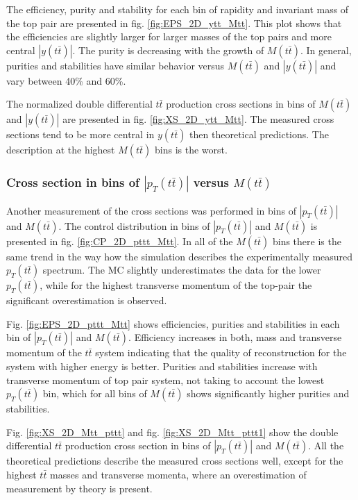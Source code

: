 The efficiency, purity and stability for each bin of rapidity and invariant mass of the top pair are presented in fig. \ref{fig:EPS_2D_ytt_Mtt}. This plot
shows that the efficiencies are slightly larger for larger masses of the top pairs and more central $|y(t\bar{t})|$. The purity is decreasing with the
growth of $M(t\bar{t})$. In general, purities and stabilities have similar behavior versus $M(t\bar{t})$ and $|y(t\bar{t})|$ and vary between 40\% and 60\%.

The normalized double differential $t\bar{t}$ production cross sections in bins of $M(t\bar{t})$ and $|y(t\bar{t})|$ are presented in fig. \ref{fig:XS_2D_ytt_Mtt}.
The measured cross sections tend to be more central in $y(t\bar{t})$ then theoretical predictions. The description at the highest $M(t\bar{t})$ bins is the worst.

\subsubsection{Cross section in bins of $|p_{T}(t\bar{t})|$ versus $M(t\bar{t})$}

Another measurement of the cross sections was performed in bins of $|p_{T}(t\bar{t})|$ and $M(t\bar{t})$.
The control distribution in bins of $|p_{T}(t\bar{t})|$ and $M(t\bar{t})$ is presented in fig. \ref{fig:CP_2D_pttt_Mtt}. In all of the $M(t\bar{t})$
bins there is the same trend in the way how the simulation describes the experimentally measured $p_{T}(t\bar{t})$ spectrum. The MC slightly underestimates
the data for the lower $p_{T}(t\bar{t})$, while for the highest transverse momentum of the top-pair the significant overestimation is observed.

Fig. \ref{fig:EPS_2D_pttt_Mtt} shows efficiencies, purities and stabilities in each bin of $|p_{T}(t\bar{t})|$ and $M(t\bar{t})$. Efficiency increases 
in both, mass and transverse momentum of the $t\bar{t}$ system indicating that the quality of reconstruction for the system with higher energy is better.
Purities and stabilities increase with transverse momentum of top pair system, not taking to account the lowest $p_{T}(t\bar{t})$ bin, which for all 
bins of $M(t\bar{t})$ shows significantly higher purities and stabilities.

Fig. \ref{fig:XS_2D_Mtt_pttt} and fig. \ref{fig:XS_2D_Mtt_pttt1} show the double differential $t\bar{t}$ production cross section in bins of $|p_{T}(t\bar{t})|$ and $M(t\bar{t})$.
All the theoretical predictions describe the measured cross sections well, except for the highest $t\bar{t}$ masses and transverse momenta, where an
overestimation of measurement by theory is present.

